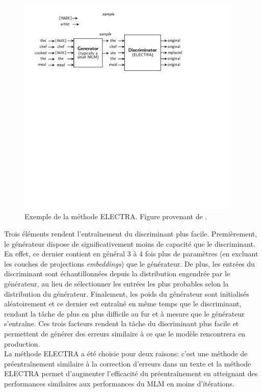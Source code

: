 \documentclass[12pt,twoside,maitrise]{dms}
\theoremstyle{definition}
\numberwithin{equation}{section}
\numberwithin{table}{chapter}
\numberwithin{figure}{chapter}
\begin{document}
\begin{figure}
	\begin{center}
		\includegraphics[width=0.95\textwidth]{figures/electra_entr.pdf}
	\end{center}
	\caption{Exemple de la méthode ELECTRA. Figure provenant de \cite{clark2020electrapretrainingtextencoders}.}
	\label{fig:electra}
\end{figure}

Trois éléments rendent l'entraînement du discriminant plus facile.
Premièrement, le générateur dispose de significativement moins de capacité que
le discriminant. En effet, ce dernier contient en général 3 à 4 fois plus de
paramètres (en excluant les couches de projections \textit{embeddings}) que le
générateur. De plus, les entrées du discriminant sont échantillonnées depuis la
distribution engendrée par le générateur, au lieu de sélectionner les entrées
les plus probables selon la distribution du générateur. Finalement, les poids
du générateur sont initialisés aléatoirement et ce dernier est entraîné en même
temps que le discriminant, rendant la tâche de plus en plus difficile au fur et
à mesure que le générateur s'entraîne. Ces trois facteurs rendent la tâche du
discriminant plus facile et permettent de générer des erreurs similaire à ce
que le modèle rencontrera en production.\\

La méthode ELECTRA a été choisie pour deux raisons: c'est une méthode de
préentraînement similaire à la correction d'erreurs dans un texte et la méthode
ELECTRA permet d'augmenter l'efficacité du préentraînement en atteignant des
performances similaires aux performances du MLM en moins d'itérations.
\end{document}
